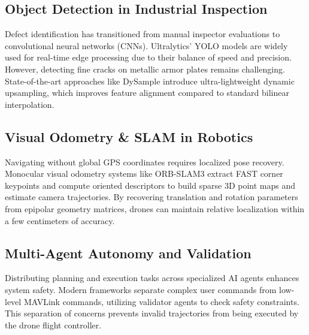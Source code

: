 \documentclass[conference]{IEEEtran}
\begin{document}
\subsection{Object Detection in Industrial Inspection}
Defect identification has transitioned from manual inspector evaluations to convolutional neural networks (CNNs). Ultralytics' YOLO models are widely used for real-time edge processing due to their balance of speed and precision. However, detecting fine cracks on metallic armor plates remains challenging. State-of-the-art approaches like DySample \cite{b4} introduce ultra-lightweight dynamic upsampling, which improves feature alignment compared to standard bilinear interpolation.

\subsection{Visual Odometry & SLAM in Robotics}
Navigating without global GPS coordinates requires localized pose recovery. Monocular visual odometry systems like ORB-SLAM3 \cite{b3} extract FAST corner keypoints and compute oriented descriptors to build sparse 3D point maps and estimate camera trajectories. By recovering translation and rotation parameters from epipolar geometry matrices, drones can maintain relative localization within a few centimeters of accuracy.

\subsection{Multi-Agent Autonomy and Validation}
Distributing planning and execution tasks across specialized AI agents enhances system safety. Modern frameworks separate complex user commands from low-level MAVLink commands, utilizing validator agents to check safety constraints. This separation of concerns prevents invalid trajectories from being executed by the drone flight controller.
\end{document}
